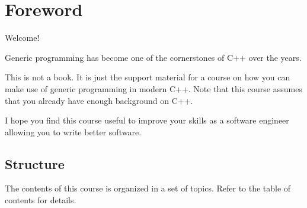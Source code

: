 \chapter*{Foreword}

Welcome!

Generic programming has become one of the cornerstones of C++ over the years.

This is not a book. It is just the support material for a course on how you can
make use of generic programming in modern C++. 
Note that this course assumes that you
already have enough background on C++.

I hope you find this course useful to improve your skills as a software
engineer allowing you to write better software.

\section*{Structure}

The contents of this course is organized in a set of topics. 
Refer to the table of contents for details.

